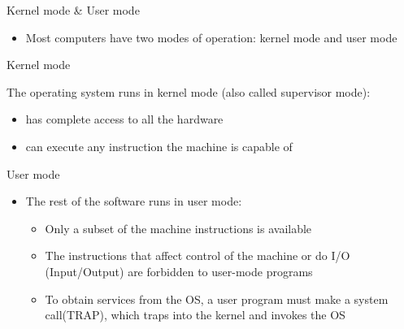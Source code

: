 \documentclass{beamer}
\begin{document}
\begin{frame}
{\centerline{Kernel mode \& User mode}}
\begin{itemize}
    \item Most computers have two modes of operation: kernel mode and user mode
\end{itemize}

\begin{figure}[htp]
    \centering
     
\end{figure}
\end{frame}


\begin{frame}
{\centerline{Kernel mode}}

The operating system runs in kernel mode (also called supervisor mode):
\begin{itemize}
    \item has complete access to all the hardware
    \item can execute any instruction the machine is capable of %
\end{itemize}
\end{frame}


\begin{frame}
{\centerline{User mode}}
\begin{itemize}
    \item The rest of the software runs in user mode:
    \begin{itemize}
        \item Only a subset of the machine instructions is available \\
        \item The instructions that affect control of the machine or do I/O (Input/Output) are forbidden to user-mode programs \\
        \item To obtain services from the OS, a user program must make a system call(TRAP), which traps into the kernel and invokes the OS \\
    \end{itemize}
\end{itemize}
\end{frame}
\end{document}
